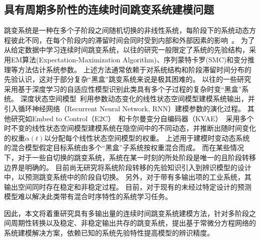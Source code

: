 \subsection{具有周期多阶性的连续时间跳变系统建模问题}
跳变系统是一种在多个子阶段之间随机切换的非线性系统，每阶段下的系统动态方程彼此不同，在每个阶段内的滞留时间会同时受到内部和外部因素的影响~\cite{WANG2022111790}。
为了从给定数据中学习连续时间跳变系统，以往的研究一般限定了系统的先验结构，采用EM算法(Expectation-Maximization Algorithm)\cite{balenzuela2022parameter}、序列蒙特卡罗(SMC)\cite{6859280}和变分推理\cite{opper2007variational}等方法估计系统参数。
上述方法通常依赖于对系统结构和阶段滞留时间分布的先验认识，这对于部分复杂“黑盒”跳变系统来说是极其困难的。
以往的一些研究采用基于深度学习的自适应性模型识别此类具有多个子过程的复杂时变“黑盒”系统。
深度状态空间模型~\cite{Deep_state_space_model}利用参数动态变化的线性状态空间模型建模系统输出，并引入循环神经网络（Recurrent Neural Network, RNN）建模参数的演化过程。
其他研究如Embed to Control（E2C）~\cite{Watter2015}和卡尔曼变分自编码器（KVAE）~\cite{Fraccaro2017}采用多个时不变的线性状态空间模型建模系统在隐空间中的不同动态，并推断出随时间变化的权重$\alpha(t)$以分配每个线性状态空间模型的权重。
上述用于建模时变动态系统的混合模型假定目标系统由多个“黑盒”子系统按权重混合而成。
而在某些情况下，对于一些自切换的跳变系统，系统在某一时刻的所处阶段是唯一的且阶段转移边界是明确的。
目前尚无研究将系统阶段转移的先验知识引入到辨识模型的设计中，以预测跳变系统中的阶段自切换。  
另外，对于带有多输出项的工业系统，其输出空间同时存在稳定和非稳定过程\cite{nason2006stationary}。
目前，对于现有的未经过特定设计的预测模型难以解决此类带有混合时序特性的系统学习任务。

因此，本文将着重研究具有多输出量的连续时间跳变系统建模方法，针对多阶段之间周期性转换以及稳定、非稳定输出共存的跳变系统，提出基于常微分方程网络的系统建模解决方案，依赖已知的系统先验特性提高模型的辨识精度。

